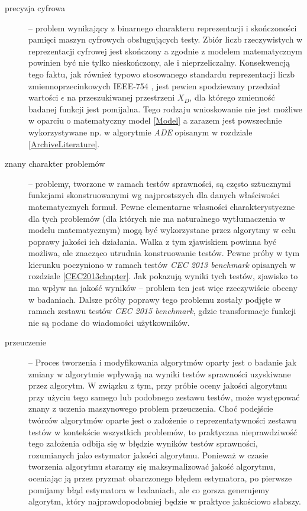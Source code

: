 \documentclass[12pt,a4paper]{report}
\begin{document}
{{{{{{{\begin{description}
\item[precyzja cyfrowa] -- problem wynikający z binarnego charakteru reprezentacji i skończoności pamięci maszyn cyfrowych obsługujących testy. Zbiór liczb rzeczywistych w reprezentacji cyfrowej jest skończony a zgodnie z modelem matematycznym powinien być nie tylko nieskończony, ale i nieprzeliczalny. Konsekwencją tego faktu, jak również typowo stosowanego standardu reprezentacji liczb zmiennoprzecinkowych IEEE-754 \cite{IEEE754}, jest pewien spodziewany przedział wartości $\epsilon$ na przeszukiwanej przestrzeni $X_D$, dla którego zmienność badanej funkcji jest pomijalna. Tego rodzaju wnioskowanie nie jest możliwe w oparciu o matematyczny model \ref{Model} a zarazem jest powszechnie wykorzystywane np. w algorytmie \emph{ADE} opisanym w rozdziale \ref{ArchiveLiterature}.
\item[znany charakter problemów] -- problemy, tworzone w ramach testów sprawności, są często sztucznymi funkcjami skonstruowanymi wg najprostszych dla danych właściwości matematycznych formuł. Pewne elementarne własności charakterystyczne dla tych problemów (dla których nie ma naturalnego wytłumaczenia w modelu matematycznym) mogą być wykorzystane przez algorytmy w celu poprawy jakości ich działania. Walka z tym zjawiskiem powinna być możliwa, ale znacząco utrudnia konstruowanie testów. Pewne próby w tym kierunku poczyniono w ramach testów \emph{CEC 2013 benchmark} opisanych w rozdziale \ref{CEC2013chapter}. Jak pokazują wyniki tych testów, zjawisko to ma wpływ na jakość wyników -- problem ten jest więc rzeczywiście obecny w badaniach. Dalsze próby poprawy tego problemu zostały podjęte w ramach zestawu testów \emph{CEC 2015 benchmark}, gdzie transformacje funkcji nie są podane do wiadomości użytkowników.
\item[przeuczenie] -- Proces tworzenia i modyfikowania algorytmów oparty jest o badanie jak zmiany w algorytmie wpływają na wyniki testów sprawności uzyskiwane przez algorytm. W związku z tym, przy próbie oceny jakości algorytmu przy użyciu tego samego lub podobnego zestawu testów, może występować znany z uczenia maszynowego problem przeuczenia. Choć podejście twórców algorytmów oparte jest o założenie o reprezentatywności zestawu testów w kontekście wszystkich problemów, to praktyczna nieprawdziwość tego założenia odbija się w błędzie wyników testów sprawności, rozumianych jako estymator jakości algorytmu. Ponieważ w czasie tworzenia algorytmu staramy się maksymalizować jakość algorytmu, oceniając ją przez pryzmat obarczonego błędem estymatora, po pierwsze pomijamy błąd estymatora w badaniach, ale co gorsza generujemy algorytm, który najprawdopodobniej będzie w praktyce jakościowo słabszy.


\end{description}}}}}}}}
\end{document}
